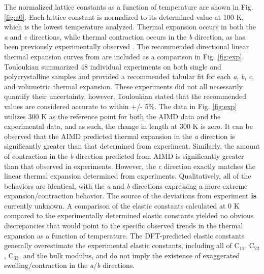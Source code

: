 \documentclass[utf8]{frontiersSCNS} %
\providecommand{\DIFaddtex}[1]{{\bf #1}} %
\providecommand{\DIFdeltex}[1]{} %
\providecommand{\DIFaddbegin}{\protect\color{blue}} %
\providecommand{\DIFaddend}{\protect\color{black}} %
\providecommand{\DIFdelbegin}{\protect\color{red}} %
\providecommand{\DIFdelend}{\protect\color{black}} %
\providecommand{\DIFadd}[1]{\texorpdfstring{\DIFaddtex{#1}}{#1}} %
\providecommand{\DIFdel}[1]{\texorpdfstring{\DIFdeltex{#1}}{}} %
\begin{document}
The normalized lattice constants as a function of temperature are shown in Fig. \ref{fig:a0}. Each lattice constant is normalized to its determined value at 100 K, which is the lowest temperature analyzed. Thermal expansion occurs in both the \textit{a} and \textit{c} directions, while thermal contraction occurs in the \textit{b} direction, as has been previously experimentally observed \cite{touloukian}. The recommended directional linear thermal expansion curves from \cite{touloukian} are included as a comparison in Fig. \ref{fig:exp}. Touloukian summarized 48 individual experiments on both single and polycrystalline samples and provided a recommended tabular fit for each \textit{a}, \textit{b}, \textit{c}, and volumetric thermal expansion. These experiments did not all necessarily quantify their uncertainty, however, Touloukian stated that the recommended values are considered accurate to within +/- 5\%. The data in Fig. \ref{fig:exp} utilizes 300 K as the reference point for both the AIMD data and the experimental data, and as such, the change in length at 300 K is zero. It can be observed that the AIMD predicted thermal expansion in the \textit{a} direction is significantly greater than that determined from experiment. Similarly, the amount of contraction in the \textit{b} direction predicted from AIMD is significantly greater than that observed in experiments. However, the \textit{c} direction exactly matches the linear thermal expansion determined from experiments. Qualitatively, all of the behaviors are identical, with the \textit{a} and \textit{b} directions expressing a more extreme expansion/contraction behavior. The source of the deviations from experiment \DIFdelbegin \DIFdel{are }\DIFdelend \DIFaddbegin \DIFadd{is }\DIFaddend currently unknown. A comparison of the elastic constants calculated at 0 K \cite{beeler2013}compared to the experimentally determined elastic constants \cite{fisher1958} yielded no obvious discrepancies that would point to the specific observed trends in the thermal expansion as a function of temperature. The DFT-predicted elastic constants generally overestimate the experimental elastic constants, including all of C$_{11}$, C$_{22}$, C$_{33}$, and the bulk modulus, and do not imply the existence of exaggerated swelling/contraction in the \textit{a}/\textit{b} directions.
\end{document}
